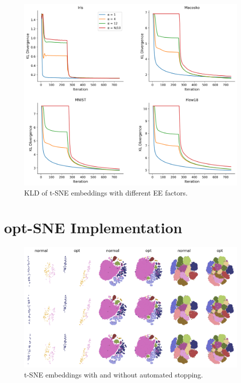 \begin{figure}[h]
    \centering 
        \includegraphics[width=\linewidth]{../code/figures/alpha_kl_divergences_grid.png}
        \caption{KLD of t-SNE embeddings with different EE factors. }
    \label{fig:alpha_kld}
\end{figure}

\newpage 
\section{opt-SNE Implementation}

\begin{figure}[h]
    \centering 
        \includegraphics[width=\linewidth]{../code/figures/opt-SNE_embedding_grid_tab20b.png}
        \caption{t-SNE embeddings with and without automated stopping.}
    \label{fig:opt-SNE_grid}
\end{figure}

